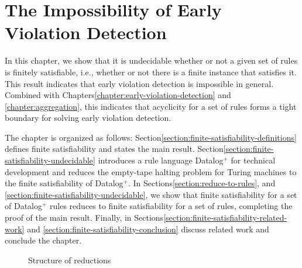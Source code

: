 \chapter{The Impossibility of Early Violation Detection}
\label{chapter:finite-satisfiability}

In this chapter,
we show that it is undecidable whether or not a given set of rules is finitely satisfiable,
i.e.,
whether or not there is a finite instance that satisfies it.
This result
indicates that early violation detection
is impossible in general.
Combined with Chapters\:\ref{chapter:early-violation-detection}
and \ref{chapter:aggregation},
this indicates
that acyclicity for a set of rules forms a tight boundary
for solving early violation detection.

The chapter is organized as follows:
Section\:\ref{section:finite-satisfiability-definitions}
defines finite satisfiability
and states the main result.
Section\:\ref{section:finite-satisfiability-undecidable}
introduces a rule language Datalog$^{+}$ for technical development
and reduces the empty-tape halting problem for Turing machines
to the finite satisfiability of Datalog$^{+}$.
In Sections\:\ref{section:reduce-to-rules},
and \:\ref{section:finite-satisfiability-undecidable},
we show that finite satisfiability for a set of Datalog$^{+}$ rules
reduces to finite satisfiability for a set of rules,
completing the proof of the main result.
Finally,
in Sections\:\ref{section:finite-satisfiability-related-work} and \ref{section:finite-satisfiability-conclusion}
discuss related work and conclude the chapter.

\begin{figure}
    \centering
{}
\caption{Structure of reductions}
\vspace{1cm}
\label{fig:reduction}
\end{figure}

